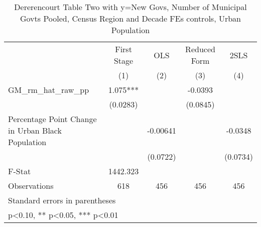 \begin{table}[htbp]\centering
\def\sym#1{\ifmmode^{#1}\else\(^{#1}\)\fi}
\caption{Dererencourt Table Two with y=New Govs, Number of Municipal Govts  Pooled, Census Region and Decade FEs controls, Urban Population}
\begin{tabular}{l*{4}{c}}
\toprule
                    & First Stage   &         OLS   &Reduced Form   &        2SLS   \\
                    &\multicolumn{1}{c}{(1)}   &\multicolumn{1}{c}{(2)}   &\multicolumn{1}{c}{(3)}   &\multicolumn{1}{c}{(4)}   \\
\midrule
GM\_rm\_hat\_raw\_pp    &       1.075***&               &     -0.0393   &               \\
                    &    (0.0283)   &               &    (0.0845)   &               \\
\addlinespace
Percentage Point Change in Urban Black Population&               &    -0.00641   &               &     -0.0348   \\
                    &               &    (0.0722)   &               &    (0.0734)   \\
\midrule
F-Stat              &    1442.323   &               &               &               \\
Observations        &         618   &         456   &         456   &         456   \\
\bottomrule
\multicolumn{5}{l}{\footnotesize Standard errors in parentheses}\\
\multicolumn{5}{l}{\footnotesize * p<0.10, ** p<0.05, *** p<0.01}\\
\end{tabular}
\end{table}
